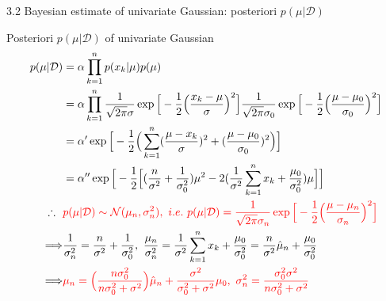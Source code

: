 \documentclass[compress,blue]{beamer}
\newcommand{\calD}{\mathcal{D}}
\begin{document}
\begin{frame}{3.2 Bayesian estimate of univariate Gaussian: posteriori $p(\mu|\calD)$}
	\begin{block}{Posteriori $p(\mu|\calD)$ of univariate Gaussian}
		\vspace{-0.15in}
		\tiny
		\begin{align}
			p(\mu|\calD) &= \alpha \prod_{k=1}^n p(x_k | \mu)p(\mu)\\
			&= \alpha \prod_{k=1}^n \frac{1}{\sqrt{2\pi}\sigma}\exp\Big[-\frac{1}{2}\Big(\frac{x_k-\mu}{\sigma}\Big)^2\Big]\frac{1}{\sqrt{2\pi}\sigma_0}\exp\Big[-\frac{1}{2}\Big(\frac{\mu-\mu_0}{\sigma_0}\Big)^2\Big]\\
			&=\alpha' \exp\Big[-\frac{1}{2}\Big(\sum_{k=1}^n(\frac{\mu-x_k}{\sigma})^2 + (\frac{\mu-\mu_0}{\sigma_0})^2\Big)\Big]\\
			&=\alpha'' \exp\Big[-\frac{1}{2}\Big[(\frac{n}{\sigma^2} + \frac{1}{\sigma_0^2})\mu^2 - 2(\frac{1}{\sigma^2}\sum_{k=1}^n x_k + \frac{\mu_0}{\sigma_0^2})\mu\Big]\Big] \\
		 	\therefore ~~& \textcolor{red}{p(\mu | \calD) \sim \mathcal{N}(\mu_n, \sigma_n^2), ~i.e.~ p(\mu|\calD) = \frac{1}{\sqrt{2\pi}\sigma_n} \exp\Big[-\frac{1}{2}\Big(\frac{\mu-\mu_n}{\sigma_n}\Big)^2\Big]}\\
			\Longrightarrow &\frac{1}{\sigma^2_n} = \frac{n}{\sigma^2} + \frac{1}{\sigma^2_0}, ~ \frac{\mu_n}{\sigma^2_n} = \frac{1}{\sigma^2}\sum_{k=1}^n x_k + \frac{\mu_0}{\sigma^2_0} = \frac{n}{\sigma^2}\hat{\mu}_n + \frac{\mu_0}{\sigma^2_0}\\
			\Longrightarrow & \textcolor{red}{\mu_n = \Big(\frac{n\sigma^2_0}{n\sigma^2_0 + \sigma^2}\Big)\hat{\mu}_n + \frac{\sigma^2}{\sigma^2_0+\sigma^2}\mu_0, ~ \sigma_n^2 = \frac{\sigma_0^2\sigma^2}{n\sigma^2_0 + \sigma^2}}
		\end{align}
		\normalsize
	\end{block}
\end{frame}
\end{document}
